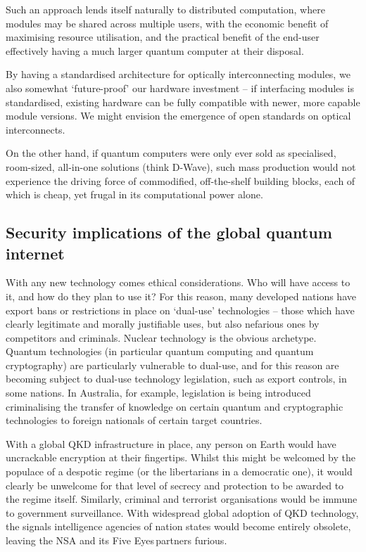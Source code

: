 \documentclass[aps,rmp,twocolumn,amsmath,amssymb,nofootinbib,superscriptaddress,longbibliography,floatfix,table-of-contents,eqsecnum]{revtex4-1}
\begin{document}
Such an approach lends itself naturally to distributed computation, where modules may be shared across multiple users, with the economic benefit of maximising resource utilisation, and the practical benefit of the end-user effectively having a much larger quantum computer at their disposal.

By having a standardised architecture for optically interconnecting modules, we also somewhat `future-proof' our hardware investment -- if interfacing modules is standardised, existing hardware can be fully compatible with newer, more capable module versions. We might envision the emergence of open standards on optical interconnects.

On the other hand, if quantum computers were only ever sold as specialised, room-sized, all-in-one solutions (think D-Wave\texttrademark), such mass production would not experience the driving force of commodified, off-the-shelf building blocks, each of which is cheap, yet frugal in its computational power alone.

%
%

\subsection{Security implications of the global quantum internet} \label{sec:sec_imp} 

With any new technology comes ethical considerations. Who will have access to it, and how do they plan to use it? For this reason, many developed nations have export bans or restrictions in place on `dual-use' technologies -- those which have clearly legitimate and morally justifiable uses, but also nefarious ones by competitors and criminals. Nuclear technology is the obvious archetype. Quantum technologies (in particular quantum computing and quantum cryptography) are particularly vulnerable to dual-use, and for this reason are becoming subject to dual-use technology legislation, such as export controls, in some nations. In Australia, for example, legislation is being introduced criminalising the transfer of knowledge on certain quantum and cryptographic technologies to foreign nationals of certain target countries.

With a global QKD infrastructure in place, any person on Earth would have uncrackable encryption at their fingertips. Whilst this might be welcomed by the populace of a despotic regime (or the libertarians in a democratic one), it would clearly be unwelcome for that level of secrecy and protection to be awarded to the regime itself. Similarly, criminal and terrorist organisations would be immune to government surveillance. With widespread global adoption of QKD technology, the signals intelligence agencies of nation states would become entirely obsolete, leaving the NSA and its Five Eyes\texttrademark \,partners furious.
\end{document}
